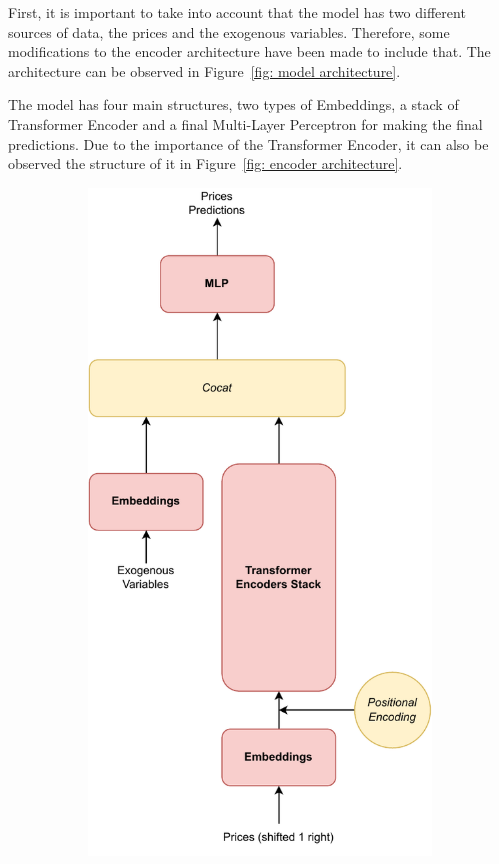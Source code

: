 \documentclass[journal]{IEEEtran}
\begin{document}
First, it is important to take into account that the model has two different sources of data, the prices and the exogenous variables. Therefore, some modifications to the encoder architecture have been made to include that. The architecture can be observed in Figure~\ref{fig: model architecture}.

The model has four main structures, two types of Embeddings, a stack of Transformer Encoder and a final Multi-Layer Perceptron for making the final predictions. Due to the importance of the Transformer Encoder, it can also be observed the structure of it in Figure~\ref{fig: encoder architecture}.

\begin{figure}
  \centering
  \begin{subfigure}{0.49\linewidth}
      \centering
      \includegraphics[width=\linewidth, height=2\linewidth]{images/model.pdf}

\end{subfigure}
\end{figure}
\end{document}
